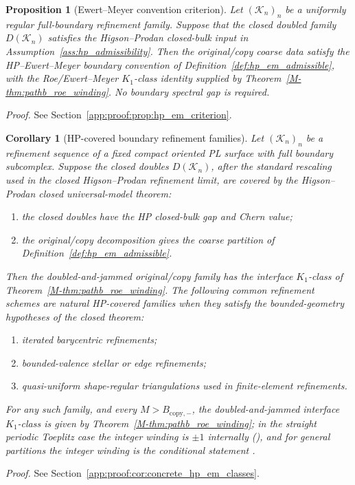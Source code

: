 \documentclass[11pt]{article}
\numberwithin{equation}{section}
\newtheorem{proposition}[theorem]{Proposition}
\newtheorem{corollary}[theorem]{Corollary}
\theoremstyle{definition}
\theoremstyle{remark}
\newcommand{\proofref}[1]{%
  \par\noindent\emph{Proof.} See Section~\ref{#1}.\par\medskip
}
\newcommand{\proofappendixref}[1]{\proofref{#1}}
\newcommand{\K}{\mathcal{K}}
\begin{document}
\begin{proposition}[Ewert--Meyer convention criterion]\label{prop:hp_em_criterion}
Let \((\K_n)_n\) be a uniformly regular full-boundary refinement family. Suppose that the closed
doubled family \(D(\K_n)\) satisfies the Higson--Prodan closed-bulk input in
Assumption~\ref{ass:hp_admissibility}. Then the original/copy coarse data satisfy the
HP--Ewert--Meyer boundary convention of Definition~\ref{def:hp_em_admissible}, with the
Roe/Ewert--Meyer \(K_1\)-class identity supplied by Theorem~\ref{M-thm:pathb_roe_winding}.
No boundary spectral gap is required.
\end{proposition}
\proofappendixref{app:proof:prop:hp_em_criterion}




\begin{corollary}[HP-covered boundary refinement families]\label{cor:concrete_hp_em_classes}
Let \((\K_n)_n\) be a refinement sequence of a fixed compact oriented PL surface with full
boundary subcomplex. Suppose the closed doubles \(D(\K_n)\), after the standard rescaling used in
the closed Higson--Prodan refinement limit, are covered by the Higson--Prodan closed universal-model
theorem:
\begin{enumerate}[label=(\roman*),leftmargin=2em]
\item the closed doubles have the HP closed-bulk gap and Chern value;
\item the original/copy decomposition gives the coarse partition of
  Definition~\ref{def:hp_em_admissible}.
\end{enumerate}
Then the doubled-and-jammed original/copy family has the interface \(K_1\)-class of
Theorem~\ref{M-thm:pathb_roe_winding}. The following common refinement schemes are natural
HP-covered families when they satisfy the bounded-geometry hypotheses of the closed
theorem:
\begin{enumerate}[label=(\alph*),leftmargin=2em]
\item iterated barycentric refinements;
\item bounded-valence stellar or edge refinements;
\item quasi-uniform shape-regular triangulations used in finite-element refinements.
\end{enumerate}
For any such family, and every \(M>B_{\mathrm{copy},-}\), the doubled-and-jammed interface
\(K_1\)-class is given by Theorem~\ref{M-thm:pathb_roe_winding}; in the straight periodic
Toeplitz case the integer winding is \(\pm1\) internally (),
and for general partitions the integer winding is the conditional statement
.
\end{corollary}
\proofappendixref{app:proof:cor:concrete_hp_em_classes}
\end{document}
